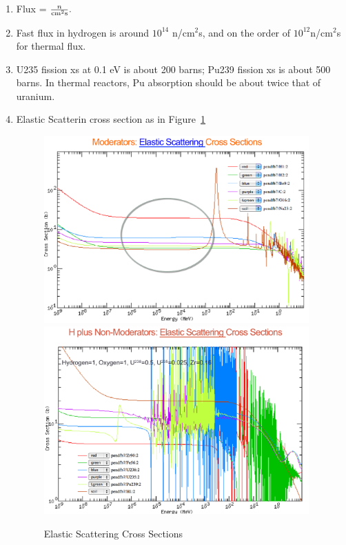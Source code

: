 \documentclass{school-22.211-notes}
\begin{document}
\begin{enumerate}
\item Flux = $\frac{n}{\mathrm{cm}^2 \mathrm{s}}.$

\item Fast flux in hydrogen is around $10^{14}$ n/cm$^2$s, and on the order of $10^{12}$n/cm$^2$s for thermal flux. 

\item U235 fission xs at 0.1 eV is about 200 barns; Pu239 fission xs is about 500 barns. In thermal reactors, Pu absorption should be about twice that of uranium. 

\item Elastic Scatterin cross section as in Figure~\ref{scatter-xs}
\begin{figure}
  \centering
  \includegraphics[width=4in]{images/scatter-xs-moderator.png}
  \\
  \includegraphics[width=4in]{images/scatter-xs-LWR.png}
  \caption{Elastic Scattering Cross Sections} \label{scatter-xs}
\end{figure}


\end{enumerate}
\end{document}
